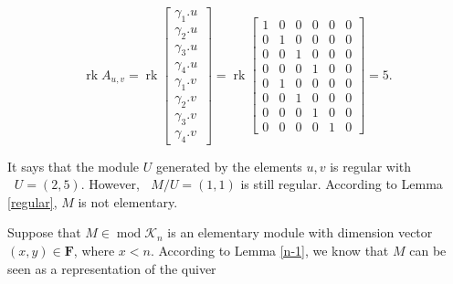 \documentclass[a4paper,12pt]{amsart}
\newcommand{\cK}{\mathcal{K}}
\DeclareMathOperator{\rk}{rk}
\DeclareMathOperator{\modd}{mod}
\DeclareMathOperator{\dimu}{\underline{dim}}
\begin{document}
\[\rk A_{u, v}=\rk \begin{bmatrix}
\gamma_1.u\\
\gamma_2.u\\
\gamma_3.u\\
\gamma_4.u\\
\gamma_1.v\\
\gamma_2.v\\
\gamma_3.v\\
\gamma_4.v\
\end{bmatrix} = \rk  \begin{bmatrix}
1 & 0 & 0 & 0 & 0 & 0\\
0 &  1& 0 & 0 & 0 & 0 \\
0 & 0 & 1 & 0 & 0 & 0\\
 0 & 0 &0 &1 & 0 & 0\\
 0& 1 & 0 & 0 & 0 & 0\\
0 &  0& 1 & 0 & 0 & 0 \\
0 & 0 & 0 & 1 & 0 & 0\\
 0 & 0 &0 &0 & 1 & 0
\end{bmatrix}=5. \]

It says that the module $U$ generated by the elements $u,v$  is regular with $\dimu U=(2,5)$. However, $\dimu M/U=(1,1)$ is still regular. According to Lemma \ref{regular}, $M$ is not elementary.



 Suppose that $M\in \modd \cK_n$ is an elementary module with dimension vector  $(x,y)\in \mathbf{F}$, where $x<n$.  According to Lemma \ref{n-1}, we know that  $M$ can be seen as  a representation of the quiver
\end{document}
